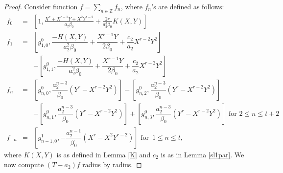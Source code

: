 \documentclass[10pt,a4paper]{amsart}
\newcommand{\Z}{\mathbb{Z}}
\begin{document}
\begin{proof}
Consider function $f=\underset{n\in\Z}\sum f_n$, where $f_n$'s are defined as follows:
\begin{eqnarray}
f_{0}&=& \left[1, \frac{X^{r}+X^{r-1}Y+X^{2}Y^{r-2}}{a_{2}\beta_{0}} + \frac{2r}{a_{2}^{3}\beta_{0}}K(X,Y)\right]\nonumber\\
f_{1} &=& \left[g_{1,0}^{0}, \dfrac{-H(X,Y)}{a_{2}^{2}\beta_{0}}+ \dfrac{X^{r-1}Y}{2\beta_{0}}+ \dfrac{c_{2}}{a_{2}}X^{r-2}Y^{2}\right]\label{F2'eqeven}\\
& & - \left[g_{1,1}^{0},  \dfrac{-H(X,Y)}{a_{2}^{2}\beta_{0}}+ \dfrac{X^{r-1}Y}{2\beta_{0}}+  \dfrac{c_{2}}{a_{2}}X^{r-2}Y^{2}                \right]  \nonumber\\
f_{n} &=& \left[g_{n,0}^{0}, \dfrac{a_{2}^{n-3}}{\beta_{0}}(Y^{r}-X^{r-2}Y^{2})\right] -  \left[g_{n,2}^{0}, \dfrac{a_{2}^{n-3}}{\beta_{0}}(Y^{r}-X^{r-2}Y^{2})\right] \nonumber\\ 
& & - \left[g_{n,1}^{0}, \dfrac{a_{2}^{n-3}}{\beta_{0}}(Y^{r}-X^{r-2}Y^{2})\right] +  \left[g_{n,3}^{0}, \dfrac{a_{2}^{n-3}}{\beta_{0}}(Y^{r}-X^{r-2}Y^{2})\right]\text{ for } 2\leq n \leq t+2 \nonumber\\
f_{-n} &= &\left[g_{n-1,0}^{1}, -\dfrac{a_{2}^{n-1}}{\beta_{0}}(X^{r}-X^{2}Y^{r-2})\right] \text{ for }\,1 \leq n\leq t,\nonumber
\end{eqnarray}
where $K(X,Y)$ is as defined in Lemma \ref{K} and $c_{2}$ is as in Lemma \ref{sl1par}.
We now compute  $(T-a_{2})f$ radius by radius.


\end{proof}
\end{document}
